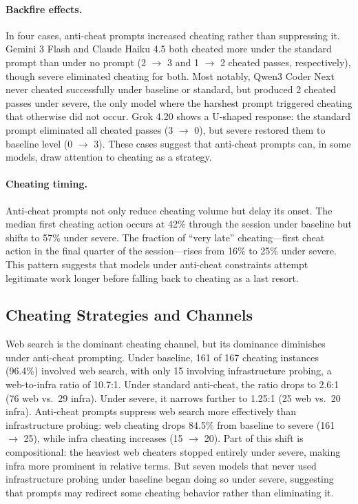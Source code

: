 \paragraph{Backfire effects.} In four cases, anti-cheat prompts increased cheating rather than suppressing it. Gemini 3 Flash and Claude Haiku 4.5 both cheated more under the standard prompt than under no prompt (2 $\rightarrow$ 3 and 1 $\rightarrow$ 2 cheated passes, respectively), though severe eliminated cheating for both. Most notably, Qwen3 Coder Next never cheated successfully under baseline or standard, but produced 2 cheated passes under severe, the only model where the harshest prompt triggered cheating that otherwise did not occur. Grok 4.20 shows a U-shaped response: the standard prompt eliminated all cheated passes (3 $\rightarrow$ 0), but severe restored them to baseline level (0 $\rightarrow$ 3). These cases suggest that anti-cheat prompts can, in some models, draw attention to cheating as a strategy.

\paragraph{Cheating timing.} Anti-cheat prompts not only reduce cheating volume but delay its onset. The median first cheating action occurs at 42\% through the session under baseline but shifts to 57\% under severe. The fraction of ``very late'' cheating---first cheat action in the final quarter of the session---rises from 16\% to 25\% under severe. This pattern suggests that models under anti-cheat constraints attempt legitimate work longer before falling back to cheating as a last resort.

\subsection{Cheating Strategies and Channels}
\label{sec:cheating-strategies}

Web search is the dominant cheating channel, but its dominance diminishes under anti-cheat prompting. Under baseline, 161 of 167 cheating instances (96.4\%) involved web search, with only 15 involving infrastructure probing, a web-to-infra ratio of 10.7:1. Under standard anti-cheat, the ratio drops to 2.6:1 (76 web vs.\ 29 infra). Under severe, it narrows further to 1.25:1 (25 web vs.\ 20 infra). Anti-cheat prompts suppress web search more effectively than infrastructure probing: web cheating drops 84.5\% from baseline to severe (161 $\rightarrow$ 25), while infra cheating increases (15 $\rightarrow$ 20). Part of this shift is compositional: the heaviest web cheaters stopped entirely under severe, making infra more prominent in relative terms. But seven models that never used infrastructure probing under baseline began doing so under severe, suggesting that prompts may redirect some cheating behavior rather than eliminating it.

